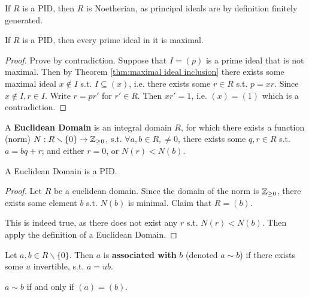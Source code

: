 \begin{remark}
    If $R$ is a PID, then $R$ is Noetherian, as principal ideals are by definition finitely generated.
\end{remark}

\begin{proposition}\label{prop:PID prime is maximal}
    If $R$ is a PID, then every prime ideal in it is maximal.
\end{proposition}

\begin{proof}
    Prove by contradiction. Suppose that $I = (p)$ is a prime ideal that is not maximal. Then by Theorem \ref{thm:maximal ideal inclusion} there exists some maximal ideal $x\notin I$ s.t. $I \subseteq (x)$, i.e. there exists some $r\in R$ s.t. $p = xr$. Since $x\notin I, r\in I$. Write $r = pr'$ for $r'\in R$. Then $xr'=1$, i.e. $(x) = (1)$ which is a contradiction.
\end{proof}

\begin{definition}
    A \textbf{Euclidean Domain} is an integral domain $R$, for which there exists a function (norm) $N: R\smallsetminus\{0\} \to \mathbb{Z}_{\geq 0}$, s.t. $\forall a, b\in R, \neq 0$, there exists some $q, r\in R$ s.t. $a = bq + r$; and either $r = 0$, or $N(r) < N(b)$.
\end{definition}

\begin{proposition}\label{prop:Euclidean Domain is PID}
    A Euclidean Domain is a PID.
\end{proposition}

\begin{proof}
    Let $R$ be a euclidean domain. Since the domain of the norm is $\mathbb{Z}_{\geq 0}$, there exists some element $b$ s.t. $N(b)$ is minimal. Claim that $R = (b)$.

    This is indeed true, as there does not exist any $r$ s.t. $N(r) < N(b)$. Then apply the definition of a Euclidean Domain.
\end{proof}

\begin{definition}
    Let $a, b\in R\smallsetminus\{0\}$. Then $a$ is \textbf{associated with} $b$ (denoted $a \sim b$) if there exists some $u$ invertible, s.t. $a = ub$.
\end{definition}

\begin{remark}
    $a \sim b$ if and only if $(a) = (b)$.
\end{remark}

